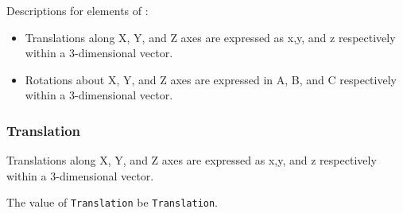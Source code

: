 Descriptions for elements of :

\begin{itemize}

\item {} \newline Translations along X, Y, and Z axes are expressed as x,y, and z respectively within a 3-dimensional vector. 

\item {} \newline Rotations about X, Y, and Z axes are expressed in A, B, and C respectively within a 3-dimensional vector. 

\end{itemize}

\subsubsection{Translation}
\label{sec:Translation}



Translations along X, Y, and Z axes are expressed as x,y, and z respectively within a 3-dimensional vector. 


The value of \texttt{Translation} \MUST be \texttt{Translation}.

